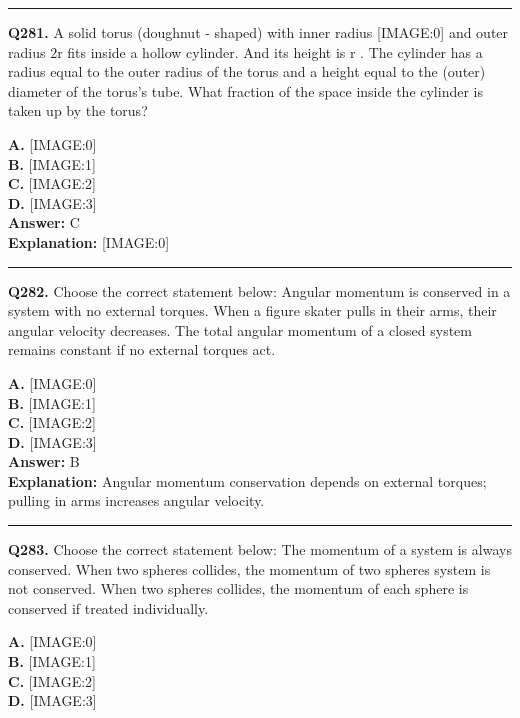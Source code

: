 \documentclass[12pt]{article}
\begin{document}
\hrule
\vspace{1em}


\noindent
\textbf{Q281.} A solid torus (doughnut - shaped) with inner radius
[IMAGE:0]
and outer radius 2r
fits inside a hollow cylinder. And its height is r
. The cylinder has a radius equal to the outer radius of the torus and a height equal to the (outer) diameter of the torus's tube. What fraction of the space inside the cylinder is taken up by the torus?



\textbf{A.} [IMAGE:0] \\
\textbf{B.} [IMAGE:1] \\
\textbf{C.} [IMAGE:2] \\
\textbf{D.} [IMAGE:3] \\

\textbf{Answer:} C \\
\textbf{Explanation:} [IMAGE:0]

\hrule
\vspace{1em}


\noindent
\textbf{Q282.} Choose the correct statement below:
Angular momentum is conserved in a system with no external torques.
When a figure skater pulls in their arms, their angular velocity decreases.
The total angular momentum of a closed system remains constant if no external torques act.



\textbf{A.} [IMAGE:0] \\
\textbf{B.} [IMAGE:1] \\
\textbf{C.} [IMAGE:2] \\
\textbf{D.} [IMAGE:3] \\

\textbf{Answer:} B \\
\textbf{Explanation:} Angular momentum conservation depends on external torques; pulling in arms increases angular velocity.

\hrule
\vspace{1em}


\noindent
\textbf{Q283.} Choose the correct statement below:
The momentum of a system is always conserved.
When two spheres collides, the momentum of two spheres system is not conserved.
When two spheres collides, the momentum of each sphere is conserved if treated individually.



\textbf{A.} [IMAGE:0] \\
\textbf{B.} [IMAGE:1] \\
\textbf{C.} [IMAGE:2] \\
\textbf{D.} [IMAGE:3] \\
\end{document}
